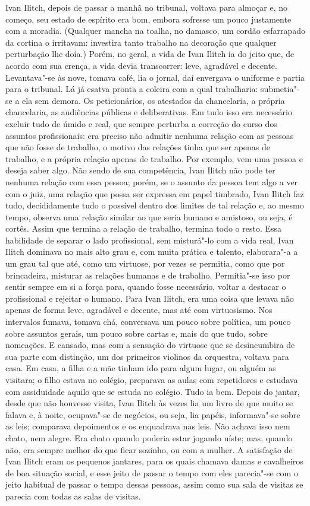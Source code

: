 Ivan Ilitch, depois de passar a manhã no tribunal, voltava para almoçar
e, no começo, seu estado de espírito era bom, embora sofresse um pouco
justamente com a moradia. (Qualquer mancha na toalha, no damasco, um
cordão esfarrapado da cortina o irritavam: investira tanto trabalho na
decoração que qualquer perturbação lhe doía.) Porém, no geral, a vida de
Ivan Ilitch ia do jeito que, de acordo com sua crença, a vida devia
transcorrer: leve, agradável e decente. Levantava"-se às nove, tomava
café, lia o jornal, daí envergava o uniforme e partia para o tribunal.
Lá já esatva pronta a coleira com a qual trabalharia: submetia"-se a ela
sem demora. Os peticionários, os atestados da chancelaria, a própria
chancelaria, as audiências públicas e deliberativas. Em tudo isso era
necessário excluir tudo de úmido e real, que sempre perturba a correção
do curso dos assuntos profissionais: era preciso não admitir nenhuma
relação com as pessoas que não fosse de trabalho, o motivo das relações
tinha que ser apenas de trabalho, e a própria relação apenas de
trabalho. Por exemplo, vem uma pessoa e deseja saber algo. Não sendo de
sua competência, Ivan Ilitch não pode ter nenhuma relação com essa
pessoa; porém, se o assunto da pessoa tem algo a ver com o juiz, uma
relação que possa ser expressa em papel timbrado, Ivan Ilitch faz tudo,
decididamente tudo o possível dentro dos limites de tal relação e, ao
mesmo tempo, observa uma relação similar ao que seria humano e amistoso,
ou seja, é cortês. Assim que termina a relação de trabalho, termina todo
o resto. Essa habilidade de separar o lado profissional, sem misturá"-lo
com a vida real, Ivan Ilitch dominava no mais alto grau e, com muita
prática e talento, elaborara"-a a um grau tal que até, como um virtuose,
por vezes se permitia, como que por brincadeira, misturar as relações
humanas e de trabalho. Permitia"-se isso por sentir sempre em si a força
para, quando fosse necessário, voltar a destacar o profissional e
rejeitar o humano. Para Ivan Ilitch, era uma coisa que levava não apenas
de forma leve, agradável e decente, mas até com virtuosismo. Nos
intervalos fumava, tomava chá, conversava um pouco sobre política, um
pouco sobre assuntos gerais, um pouco sobre cartas e, mais do que tudo,
sobre nomeações. E cansado, mas com a sensação do virtuose que se
desincumbira de sua parte com distinção, um dos primeiros violinos da
orquestra, voltava para casa. Em casa, a filha e a mãe tinham ido para
algum lugar, ou alguém as visitara; o filho estava no colégio, preparava
as aulas com repetidores e estudava com assiduidade aquilo que se estuda
no colégio. Tudo ia bem. Depois do jantar, desde que não houvesse
visita, Ivan Ilitch às vezes lia um livro de que muito se falava e, à
noite, ocupava"-se de negócios, ou seja, lia papéis, informava"-se sobre
as leis; comparava depoimentos e os enquadrava nas leis. Não achava isso
nem chato, nem alegre. Era chato quando poderia estar jogando uíste;
mas, quando não, era sempre melhor do que ficar sozinho, ou com a
mulher. A satisfação de Ivan Ilitch eram os pequenos jantares, para os
quais chamava damas e cavalheiros de boa situação social, e esse jeito
de passar o tempo com eles parecia"-se com o jeito habitual de passar o
tempo dessas pessoas, assim como sua sala de visitas se parecia com
todas as salas de visitas.

